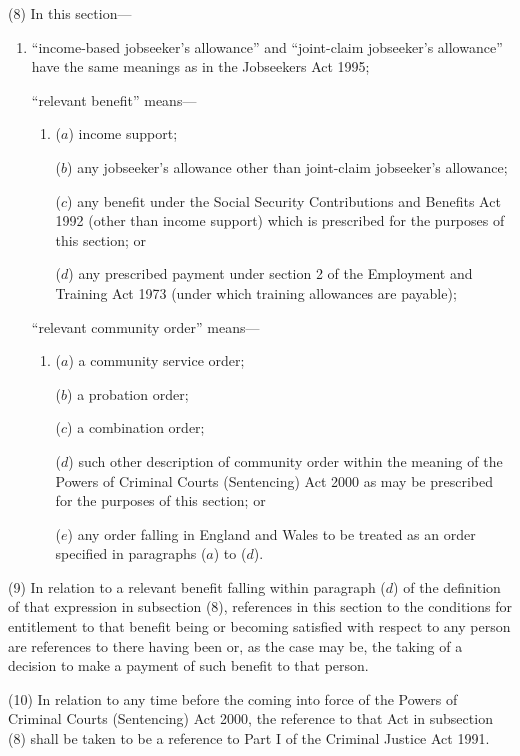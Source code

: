 \documentclass[12pt,a4paper]{article}
\begin{document}
(8) In this section—
\begin{enumerate}\item[]
    “income-based jobseeker’s allowance” and “joint-claim jobseeker’s allowance” have the same meanings as in the Jobseekers Act 1995;

    “relevant benefit” means—
\begin{enumerate}\item[]
    ($a$) 
    income support;

    ($b$) 
    any jobseeker’s allowance other than joint-claim jobseeker’s allowance;

    ($c$) 
    any benefit under the Social Security Contributions and Benefits Act 1992 (other than income support) which is prescribed for the purposes of this section; or

    ($d$) 
    any prescribed payment under section 2 of the Employment and Training Act 1973 (under which training allowances are payable);
\end{enumerate}

    “relevant community order” means—
\begin{enumerate}\item[]
    ($a$) 
    a community service order;

    ($b$) 
    a probation order;

    ($c$) 
    a combination order;

    ($d$) 
    such other description of community order within the meaning of the Powers of Criminal Courts (Sentencing) Act 2000 as may be prescribed for the purposes of this section; or

    ($e$) 
    any order falling in England and Wales to be treated as an order specified in paragraphs ($a$)  to ($d$). 
\end{enumerate}
\end{enumerate}

(9) In relation to a relevant benefit falling within paragraph ($d$)  of the definition of that expression in subsection (8), references in this section to the conditions for entitlement to that benefit being or becoming satisfied with respect to any person are references to there having been or, as the case may be, the taking of a decision to make a payment of such benefit to that person.

(10) In relation to any time before the coming into force of the Powers of Criminal Courts (Sentencing) Act 2000, the reference to that Act in subsection (8)  shall be taken to be a reference to Part I of the Criminal Justice Act 1991. 
\end{document}
